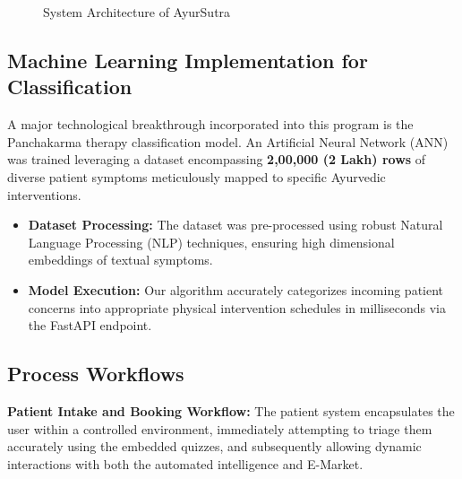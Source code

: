 \documentclass[10pt]{article}
\begin{document}
{\begin{figure}[H]
    \caption{System Architecture of AyurSutra}
\end{figure}

\subsection{Machine Learning Implementation for Classification}
A major technological breakthrough incorporated into this program is the Panchakarma therapy classification model. An Artificial Neural Network (ANN) was trained leveraging a dataset encompassing \textbf{2,00,000 (2 Lakh) rows} of diverse patient symptoms meticulously mapped to specific Ayurvedic interventions. 
\begin{itemize}
    \item \textbf{Dataset Processing:} The dataset was pre-processed using robust Natural Language Processing (NLP) techniques, ensuring high dimensional embeddings of textual symptoms. 
    \item \textbf{Model Execution:} Our algorithm accurately categorizes incoming patient concerns into appropriate physical intervention schedules in milliseconds via the FastAPI endpoint.
\end{itemize}

\newpage
\subsection{Process Workflows}

\textbf{Patient Intake and Booking Workflow:}
The patient system encapsulates the user within a controlled environment, immediately attempting to triage them accurately using the embedded quizzes, and subsequently allowing dynamic interactions with both the automated intelligence and E-Market.

\begin{figure}[H]
    \centering
\end{figure}}
\end{document}
